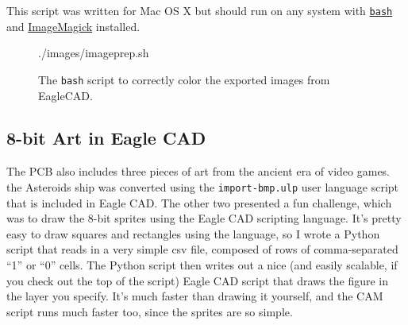 \documentclass[12pt]{article}
\newcommand{\+}{\item}		%
\begin{document}
\noindent This script was written for Mac OS X but should run on any system with 
{\color{webblue}\href{https://en.wikipedia.org/wiki/Bash_%28Unix_shell%29}{\texttt{bash}}}
and {\color{webblue}\href{http://www.imagemagick.org/script/index.php}{ImageMagick}} installed.

\newpage

\begin{figure}[ht!]
\vspace{-0.5in}

 {./images/imageprep.sh}
\caption{The \texttt{bash} script to correctly color the exported images from EagleCAD.}
\label{fig:codelistconvert}

\end{figure}

\clearpage
\newpage

\subsection{8-bit Art in Eagle CAD}

The PCB also includes three pieces of art from the ancient era of video games. the Asteroids ship was converted using the \texttt{import-bmp.ulp} user language script that is included in Eagle CAD. The other two presented a fun challenge, which was to draw the 8-bit sprites using the Eagle CAD scripting language. It's pretty easy to draw squares and rectangles using the language, so I wrote a Python script that reads in a very simple csv file, composed of rows of comma-separated ``1'' or ``0'' cells. The Python script then writes out a nice (and easily scalable, if you check out the top of the script) Eagle CAD script that draws the figure in the layer you specify. It's much faster than drawing it yourself, and the CAM script runs much faster too, since the sprites are so simple.

\medskip
\end{document}
